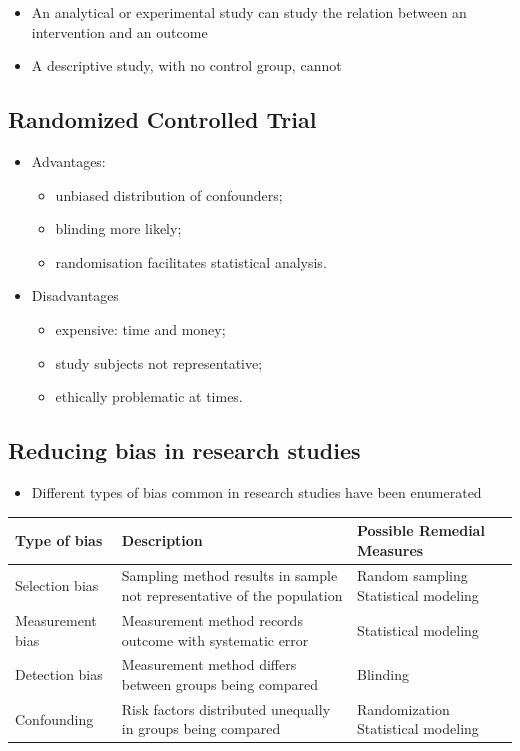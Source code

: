 \documentclass[
]{book}
\providecommand{\tightlist}{%
  \setlength{\itemsep}{0pt}\setlength{\parskip}{0pt}}
\begin{document}
\begin{itemize}
\tightlist
\item
  An analytical or experimental study can study the relation between an intervention and an outcome
\item
  A descriptive study, with no control group, cannot
\end{itemize}

\hypertarget{randomized-controlled-trial}{%
\subsection{Randomized Controlled Trial}\label{randomized-controlled-trial}}

\begin{itemize}
\tightlist
\item
  Advantages:

  \begin{itemize}
  \tightlist
  \item
    unbiased distribution of confounders;
  \item
    blinding more likely;
  \item
    randomisation facilitates statistical analysis.
  \end{itemize}
\item
  Disadvantages

  \begin{itemize}
  \tightlist
  \item
    expensive: time and money;
  \item
    study subjects not representative;
  \item
    ethically problematic at times.
  \end{itemize}
\end{itemize}

\hypertarget{reducing-bias-in-research-studies-1}{%
\subsection{Reducing bias in research studies}\label{reducing-bias-in-research-studies-1}}

\begin{itemize}
\tightlist
\item
  Different types of bias common in research studies have been enumerated
\end{itemize}

\begin{tabular}{l|l|l}
\hline
Type of bias & Description & Possible Remedial Measures\\
\hline
Selection bias & Sampling method results in sample not representative of the population & Random sampling Statistical modeling\\
\hline
Measurement bias & Measurement method records outcome with systematic error & Statistical modeling\\
\hline
Detection bias & Measurement method differs between groups being compared & Blinding\\
\hline
Confounding & Risk factors distributed unequally in groups being compared & Randomization Statistical modeling\\
\hline
\end{tabular}
\end{document}
